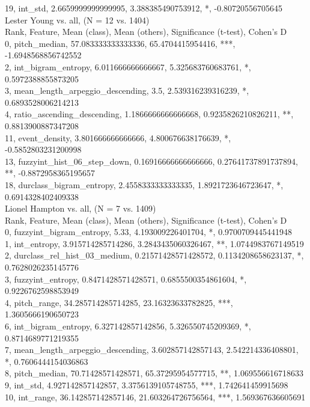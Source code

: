 19, int_std, 2.6659999999999995, 3.388385490753912, *, -0.80720556705645\\
Lester Young vs. all, (N = 12 vs. 1404)\\
Rank, Feature, Mean (class), Mean (others), Significance (t-test), Cohen's D\\
0, pitch_median, 57.083333333333336, 65.4704415954416, ***, -1.6948568856742552\\
2, int_bigram_entropy, 6.011666666666667, 5.325683760683761, *, 0.5972388855873205\\
3, mean_length_arpeggio_descending, 3.5, 2.539316239316239, *, 0.6893528006214213\\
4, ratio_ascending_descending, 1.1866666666666668, 0.9235826210826211, **, 0.8813900887347208\\
11, event_density, 3.801666666666666, 4.800676638176639, *, -0.5852803231200998\\
13, fuzzyint_hist_06_step_down, 0.16916666666666666, 0.27641737891737894, **, -0.8872958365195657\\
18, durclass_bigram_entropy, 2.4558333333333335, 1.8921723646723647, *, 0.6914328402409338\\
Lionel Hampton vs. all, (N = 7 vs. 1409)\\
Rank, Feature, Mean (class), Mean (others), Significance (t-test), Cohen's D\\
0, fuzzyint_bigram_entropy, 5.33, 4.193009226401704, *, 0.9700709445441948\\
1, int_entropy, 3.915714285714286, 3.2843435060326467, **, 1.0744983767149519\\
2, durclass_rel_hist_03_medium, 0.21571428571428572, 0.1134208658623137, *, 0.7628026235145776\\
3, fuzzyint_entropy, 0.8471428571428571, 0.6855500354861604, *, 0.9226762598853949\\
4, pitch_range, 34.285714285714285, 23.16323633782825, ***, 1.3605666190650723\\
6, int_bigram_entropy, 6.327142857142856, 5.326550745209369, *, 0.8714689771219355\\
7, mean_length_arpeggio_descending, 3.602857142857143, 2.542214336408801, *, 0.7606444154036863\\
8, pitch_median, 70.71428571428571, 65.37295954577715, **, 1.069556616718633\\
9, int_std, 4.927142857142857, 3.3756139105748755, ***, 1.742641459915698\\
10, int_range, 36.142857142857146, 21.603264726756564, ***, 1.569367636605691\\
